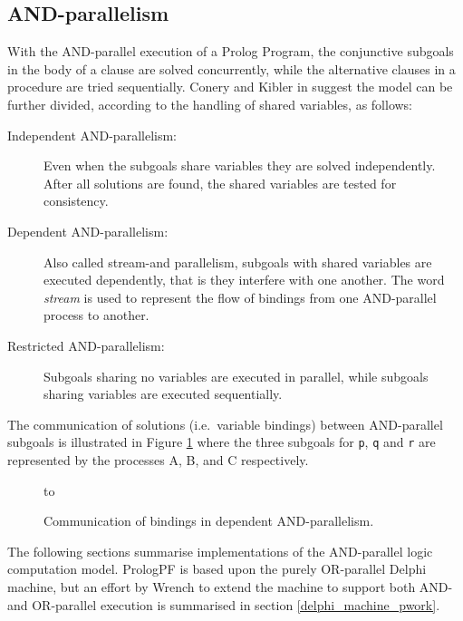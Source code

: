 \subsection{AND-parallelism}
\label{and_parallelism_section}


With the AND-parallel execution of a Prolog Program, the conjunctive subgoals in the
body of a clause are solved concurrently, while the alternative clauses in a
procedure are tried sequentially.
Conery and Kibler in \cite{CK81} suggest the model can be further divided,
according to the handling of shared variables, as follows:
\begin{description}
\item[Independent AND-parallelism:]{ Even when the subgoals share variables
  they are solved independently.  After all solutions are found, the shared
  variables are tested for consistency.}
\item[Dependent AND-parallelism:]{ Also called stream-and parallelism, subgoals
  with shared variables are executed dependently, that is they interfere with
  one another.  The word \textit{stream} is used to represent the flow of bindings
  from one AND-parallel process to another.}
\item[Restricted AND-parallelism:]{ Subgoals sharing no variables are executed in
  parallel, while subgoals sharing variables are executed sequentially.}
\end{description}

The communication of solutions (i.e.\ variable bindings) between AND-parallel
subgoals is illustrated in Figure \ref{stream} where the three subgoals for
\texttt{p}, \texttt{q} and \texttt{r} are
represented by the processes A, B, and C respectively.

\begin{figure}[h]
\vspace{5mm} \hbox to 
\caption{Communication of bindings in dependent AND-parallelism.}
\vspace{5mm}
\label{stream}
\end{figure}

The following sections summarise implementations of the AND-parallel logic computation
model.  PrologPF is based upon the purely OR-parallel Delphi machine, but an effort
by Wrench \cite{Wre90} to extend the machine to support both
AND- and OR-parallel execution is summarised in section \ref{delphi_machine_pwork}.

